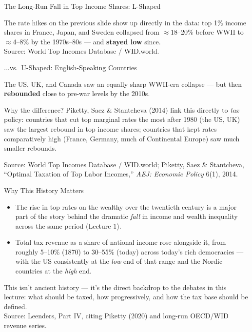 \documentclass[11pt,aspectratio=169]{beamer}
\newcommand{\srcnote}[1]{{\footnotesize\color{wugray}Source: #1}}
\begin{document}
\begin{frame}{The Long-Run Fall in Top Income Shares: L-Shaped}
  \begin{center}
  \end{center}
  \centering
  \footnotesize
  The rate hikes on the previous slide show up directly in the data: top 1\% income shares in France, Japan, and Sweden collapsed from \(\approx\)18--20\% before WWII to \(\approx\)4--8\% by the 1970s--80s --- and \textbf{stayed low} since.\\
  \srcnote{World Top Incomes Database / WID.world.}
\end{frame}

\begin{frame}{...vs.\ U-Shaped: English-Speaking Countries}
  \begin{center}
  \end{center}
  \footnotesize
  The US, UK, and Canada saw an equally sharp WWII-era collapse --- but then \textbf{rebounded} close to pre-war levels by the 2010s.
  \vspace{0.3em}
  \begin{alertblock}{Why the difference?}
    Piketty, Saez \& Stantcheva (2014) link this directly to \emph{tax} policy: countries that cut top marginal rates the most after 1980 (the US, UK) saw the largest rebound in top income shares; countries that kept rates comparatively high (France, Germany, much of Continental Europe) saw much smaller rebounds.
  \end{alertblock}
  \srcnote{World Top Incomes Database / WID.world; Piketty, Saez \& Stantcheva, ``Optimal Taxation of Top Labor Incomes,'' \emph{AEJ: Economic Policy} 6(1), 2014.}
\end{frame}

\begin{frame}{Why This History Matters}
  \begin{itemize}
    \item The rise in top rates on the wealthy over the twentieth century is a major part of the story behind the dramatic \emph{fall} in income and wealth inequality across the same period (Lecture 1).
    \item Total tax revenue as a share of national income rose alongside it, from roughly 5--10\% (1870) to 30--55\% (today) across today's rich democracies --- with the US consistently at the \emph{low} end of that range and the Nordic countries at the \emph{high} end.
  \end{itemize}
  \vspace{0.3em}
  \centering
  \alert{This isn't ancient history --- it's the direct backdrop to the debates in this lecture: what should be taxed, how progressively, and how the tax base should be defined.}\\
  \srcnote{Leenders, Part IV, citing Piketty (2020) and long-run OECD/WID revenue series.}
\end{frame}
\end{document}
